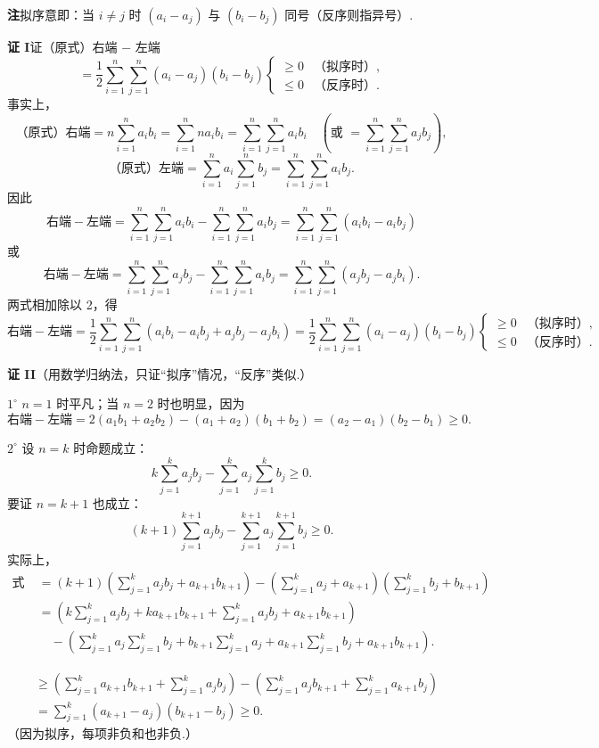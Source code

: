 \documentclass[UTF8,12pt,a4paper,fontset=fandol]{ctexart}
\begin{document}
\noindent\textbf{注}\quad 拟序意即：当 $i\ne j$ 时 $(a_i-a_j)$ 与 $(b_i-b_j)$ 同号（反序则指异号）.

\noindent\textbf{证 I}\quad 证（原式）右端 $-$ 左端
\[
=\frac12\sum_{i=1}^n\sum_{j=1}^n(a_i-a_j)(b_i-b_j)
\begin{cases}
\ge0&\text{（拟序时）},\\
\le0&\text{（反序时）}.
\end{cases}
\]
事实上，
\[
\text{（原式）右端}=n\sum_{i=1}^n a_i b_i
=\sum_{i=1}^n na_i b_i
=\sum_{i=1}^n\sum_{j=1}^n a_i b_i
\quad\left(\text{或 }=\sum_{i=1}^n\sum_{j=1}^n a_jb_j\right),
\]
\[
\text{（原式）左端}=\sum_{i=1}^n a_i\sum_{j=1}^n b_j
=\sum_{i=1}^n\sum_{j=1}^n a_i b_j.
\]
因此
\[
\text{右端}-\text{左端}
=\sum_{i=1}^n\sum_{j=1}^n a_i b_i
-\sum_{i=1}^n\sum_{j=1}^n a_i b_j
=\sum_{i=1}^n\sum_{j=1}^n(a_i b_i-a_i b_j)
\]
或
\[
\text{右端}-\text{左端}
=\sum_{i=1}^n\sum_{j=1}^n a_j b_j
-\sum_{i=1}^n\sum_{j=1}^n a_i b_j
=\sum_{i=1}^n\sum_{j=1}^n(a_j b_j-a_j b_i).
\]
两式相加除以 2，得
\[
\text{右端}-\text{左端}
=\frac12\sum_{i=1}^n\sum_{j=1}^n(a_i b_i-a_i b_j+a_j b_j-a_j b_i)
=\frac12\sum_{i=1}^n\sum_{j=1}^n(a_i-a_j)(b_i-b_j)
\begin{cases}
\ge0&\text{（拟序时）},\\
\le0&\text{（反序时）}.
\end{cases}
\]

\noindent\textbf{证 II}\quad （用数学归纳法，只证“拟序”情况，“反序”类似.）

$1^\circ$ $n=1$ 时平凡；当 $n=2$ 时也明显，因为
\[
\text{右端}-\text{左端}
=2(a_1b_1+a_2b_2)-(a_1+a_2)(b_1+b_2)
=(a_2-a_1)(b_2-b_1)\ge0.
\]

$2^\circ$ 设 $n=k$ 时命题成立：
\[
k\sum_{j=1}^k a_jb_j-\sum_{j=1}^k a_j\sum_{j=1}^k b_j\ge0. \tag{1}
\]
要证 $n=k+1$ 也成立：
\[
(k+1)\sum_{j=1}^{k+1}a_jb_j-\sum_{j=1}^{k+1}a_j\sum_{j=1}^{k+1}b_j\ge0. \tag{2}
\]
实际上，
\[
\begin{aligned}
\text{式 (2) 左端}
&=(k+1)\left(\sum_{j=1}^k a_jb_j+a_{k+1}b_{k+1}\right)
-\left(\sum_{j=1}^k a_j+a_{k+1}\right)\left(\sum_{j=1}^k b_j+b_{k+1}\right)\\
&=\left(k\sum_{j=1}^k a_jb_j+ka_{k+1}b_{k+1}
+\sum_{j=1}^k a_jb_j+a_{k+1}b_{k+1}\right)\\
&\quad-\left(\sum_{j=1}^k a_j\sum_{j=1}^k b_j
+b_{k+1}\sum_{j=1}^k a_j+a_{k+1}\sum_{j=1}^k b_j+a_{k+1}b_{k+1}\right).
\end{aligned}
\]

\[
\begin{aligned}
&\ge\left(\sum_{j=1}^k a_{k+1}b_{k+1}
+\sum_{j=1}^k a_jb_j\right)
-\left(\sum_{j=1}^k a_jb_{k+1}
+\sum_{j=1}^k a_{k+1}b_j\right)\\
&=\sum_{j=1}^k(a_{k+1}-a_j)(b_{k+1}-b_j)\ge0.
\end{aligned}
\]
（因为拟序，每项非负和也非负.）
\end{document}
